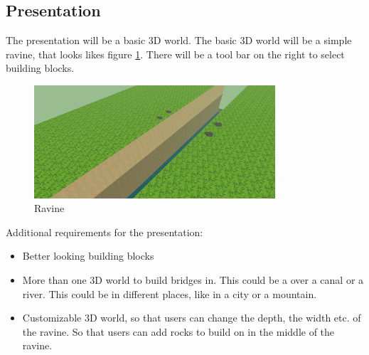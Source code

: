 \subsection{Presentation}
The presentation will be a basic 3D world. The basic 3D world will be a simple ravine, that looks likes figure \ref{fig:rav}. There will be a tool bar on the right to select building blocks.
\begin{figure}[H]
    \centering
    \includegraphics[width=0.8\textwidth]{pics/Ravine.png}
    \caption{Ravine}
    \label{fig:rav}
\end{figure}
 Additional requirements for the presentation:
 \begin{itemize}
 \item Better looking building blocks
 \item More than one 3D world to build bridges in. This could be a over a canal or a river. This could be in different places, like in a city or a mountain.
 \item Customizable 3D world, so that users can change the depth, the width etc. of the ravine. So that users can add rocks to build on in the middle of the ravine.
 \end{itemize}